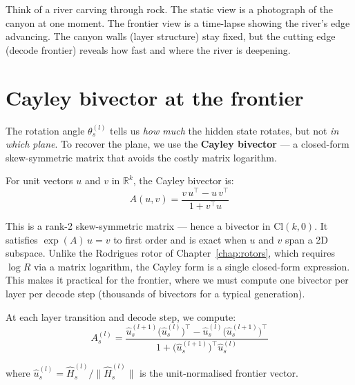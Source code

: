 \documentclass[11pt, twoside, openright]{memoir}
\numberwithin{equation}{chapter}
\begin{document}
\begin{analogy}
Think of a river carving through rock.  The static view is a
photograph of the canyon at one moment.  The frontier view is a
time-lapse showing the river's edge advancing.  The canyon walls
(layer structure) stay fixed, but the cutting edge (decode frontier)
reveals how fast and where the river is deepening.
\end{analogy}


\section{Cayley bivector at the frontier}
\label{sec:frontier-cayley}

The rotation angle $\theta^{(l)}_s$ tells us \emph{how much} the
hidden state rotates, but not \emph{in which plane}.  To recover the
plane, we use the \textbf{Cayley bivector} --- a closed-form
skew-symmetric matrix that avoids the costly matrix logarithm.

\begin{keyidea}
For unit vectors $u$ and $v$ in $\mathbb{R}^k$, the Cayley bivector
is:
\begin{equation}
  A(u, v) = \frac{v\,u^\top - u\,v^\top}{1 + v^\top u}
\end{equation}

This is a rank-2 skew-symmetric matrix --- hence a bivector in
$\mathrm{Cl}(k,0)$.  It satisfies $\exp(A) \, u = v$ to first
order and is exact when $u$ and $v$ span a 2D subspace.
Unlike the Rodrigues rotor of Chapter~\ref{chap:rotors}, which
requires $\log R$ via a matrix logarithm, the Cayley form is a
single closed-form expression.  This makes it practical for the
frontier, where we must compute one bivector per layer per decode
step (thousands of bivectors for a typical generation).
\end{keyidea}

At each layer transition and decode step, we compute:
\begin{equation}
  A^{(l)}_s
  = \frac{
      \hat{u}^{(l+1)}_s \bigl(\hat{u}^{(l)}_s\bigr)^\top
      - \hat{u}^{(l)}_s \bigl(\hat{u}^{(l+1)}_s\bigr)^\top
    }{
      1 + \bigl(\hat{u}^{(l+1)}_s\bigr)^\top \hat{u}^{(l)}_s
    }
\end{equation}

where $\hat{u}^{(l)}_s = \hat{H}^{(l)}_s / \|\hat{H}^{(l)}_s\|$
is the unit-normalised frontier vector.
\end{document}
